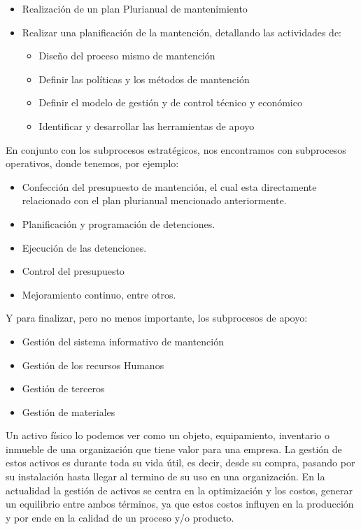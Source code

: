 \documentclass[]{article}
\begin{document}
\begin{itemize}
    \item Realización de un plan Plurianual de mantenimiento 
    \item Realizar una planificación de la mantención, detallando las actividades de:
    
    \begin{itemize}
        \item Diseño del proceso mismo de mantención
         \item Definir las políticas y los métodos de mantención 
         \item Definir el modelo de gestión y de control técnico y económico 
         \item Identificar y desarrollar las herramientas de apoyo
    \end{itemize}
\end{itemize}

En conjunto con los subprocesos estratégicos, nos encontramos con subprocesos operativos, donde tenemos, por ejemplo:


\begin{itemize}
\item Confección del presupuesto de mantención, el cual esta directamente relacionado con el plan plurianual mencionado anteriormente.
\item Planificación y programación de detenciones.
\item Ejecución de las detenciones.
\item Control del presupuesto
\item Mejoramiento continuo, entre otros.

\end{itemize}

Y para finalizar, pero no menos importante, los subprocesos de apoyo:

\begin{itemize}

\item Gestión del sistema informativo de mantención 
\item Gestión de los recursos Humanos
\item Gestión de terceros
\item Gestión de materiales


\end{itemize}

Un activo físico lo podemos ver como un objeto, equipamiento, inventario o inmueble de una organización que tiene valor para una empresa. La gestión de estos activos es durante toda su vida útil, es decir, desde su compra, pasando por su instalación hasta llegar al termino de su uso en una organización. En la actualidad la gestión de activos se centra en la optimización y los costos, generar un equilibrio entre ambos términos, ya que estos costos influyen en la producción y por ende en la calidad de un proceso y/o producto.
\end{document}
